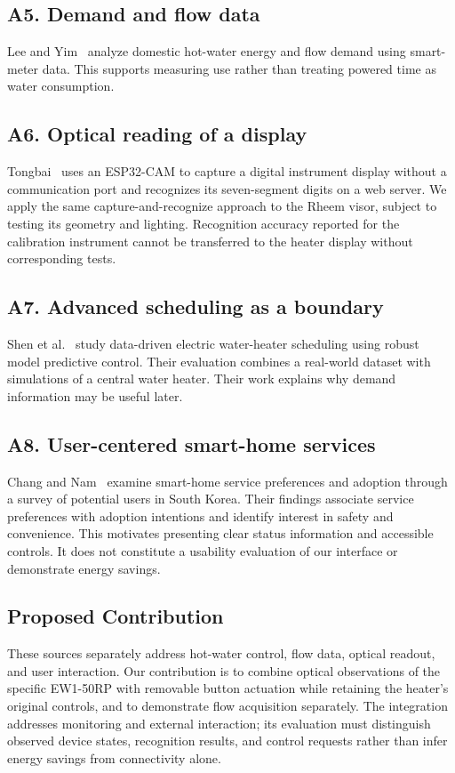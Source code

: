 \subsection*{A5. Demand and flow data}
Lee and Yim~\cite{lee2021} analyze domestic hot-water energy and flow demand using smart-meter data.
This supports measuring use rather than treating powered time as water consumption.


\subsection*{A6. Optical reading of a display}
Tongbai~\cite{tongbai2024} uses an ESP32-CAM to capture a digital instrument display
without a communication port and recognizes its seven-segment digits on a web server.
We apply the same capture-and-recognize approach to the Rheem visor, subject to testing
its geometry and lighting. Recognition accuracy reported for the calibration instrument
cannot be transferred to the heater display without corresponding tests.

\subsection*{A7. Advanced scheduling as a boundary}
Shen et al.~\cite{shen2021} study data-driven electric water-heater scheduling using
robust model predictive control. Their evaluation combines a real-world dataset with
simulations of a central water heater. Their work explains why demand information may
be useful later.

\subsection*{A8. User-centered smart-home services}
Chang and Nam~\cite{chang2021} examine smart-home service preferences and adoption
through a survey of potential users in South Korea. Their findings associate service
preferences with adoption intentions and identify interest in safety and convenience.
This motivates presenting clear status information and accessible controls. It does not
constitute a usability evaluation of our interface or demonstrate energy savings.

\subsection{Proposed Contribution}
These sources separately address hot-water control, flow data, optical readout, and user interaction.
Our contribution is to combine optical observations of the specific EW1-50RP with removable
button actuation while retaining the heater's original controls, and to demonstrate flow
acquisition separately. The integration addresses monitoring and external interaction;
its evaluation must distinguish observed device states, recognition results, and control
requests rather than infer energy savings from connectivity alone.
